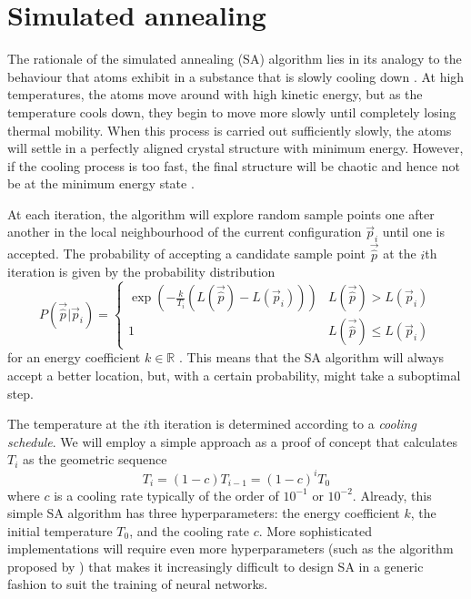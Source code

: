 \section{Simulated annealing}
The rationale of the simulated annealing (SA) algorithm lies in its analogy to the behaviour that atoms exhibit in a substance that is slowly cooling down \cite{kirkpatrick1983}.
At high temperatures, the atoms move around with high kinetic energy, but as the temperature cools down, they begin to move more slowly until completely losing thermal mobility. 
When this process is carried out sufficiently slowly, the atoms will settle in a perfectly aligned crystal structure with minimum energy. 
However, if the cooling process is too fast, the final structure will be chaotic and hence not be at the minimum energy state \cite[444]{press1992}.

At each iteration, the algorithm will explore random sample points one after another in the local neighbourhood of the current configuration $\vec{p}_i$ until one is accepted. 
The probability of accepting a candidate sample point $\vec{\hat{p}}$ at the $i$th iteration is given by the probability distribution
\begin{equation}
    P(\vec{\hat{p}}|\vec{p}_i) = \begin{cases}
        \exp{\left(-\frac{k}{T_i} \left(L(\vec{\hat{p}}) - L(\vec{p}_i)\right) \right)} & L(\vec{\hat{p}}) > L(\vec{p}_i) \\
        1 & L(\vec{\hat{p}}) \leq L(\vec{p}_i)
    \end{cases}
\end{equation}
for an energy coefficient $k\in \mathbb{R}$ \cite{rios2009}.
This means that the SA algorithm will always accept a better location, but, with a certain probability, might take a suboptimal step.

The temperature at the $i$th iteration is determined according to a \textit{cooling schedule}. 
We will employ a simple approach as a proof of concept that calculates $T_i$ as the geometric sequence
\begin{equation}
    T_i = \left(1 - c\right) T_{i-1} = \left(1 - c\right)^i T_0
\end{equation}
where $c$ is a cooling rate typically of the order of $10^{-1}$ or $10^{-2}$.
Already, this simple SA algorithm has three hyperparameters: the energy coefficient $k$, the initial temperature $T_0$, and the cooling rate $c$. 
More sophisticated implementations will require even more hyperparameters (such as the algorithm proposed by \textcite{press1992}) that makes it increasingly difficult to design SA in a generic fashion to suit the training of neural networks. 

